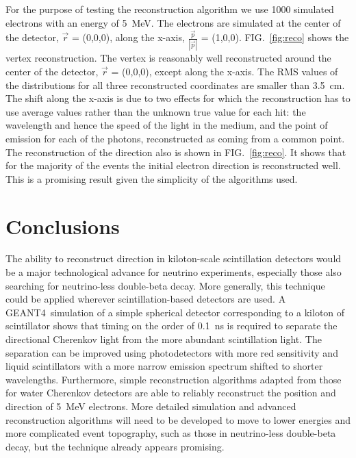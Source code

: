 \documentclass[aps,prc,twocolumn,groupedaddress,showpacs,amsmath,amssymb,floatfix,superscriptaddress]{revtex4}
\newcommand{\GEANT}{GEANT4}
\begin{document}
For the purpose of testing the reconstruction algorithm we use 1000
simulated electrons with an energy of 5~MeV. The electrons are
simulated at the center of the detector, $\vec{r}$ = (0,0,0), along
the x-axis, $\frac{\vec{p}}{|\vec{p}|}$ = (1,0,0). FIG.~\ref{fig:reco}
shows the vertex reconstruction. The vertex is reasonably well
reconstructed around the center of the detector, $\vec{r}$ = (0,0,0),
except along the x-axis. The RMS values of the distributions for all three
reconstructed coordinates are smaller than 3.5~cm. The shift along
the x-axis is due to two effects for which the reconstruction has to
use average values rather than the unknown true value for each
hit: the wavelength and hence the speed of the light in the medium,
and the point of emission for each of the photons, reconstructed
as coming from a common point. The reconstruction of the direction
also is shown in FIG.~\ref{fig:reco}. It shows that for the majority
of the events the initial electron direction is reconstructed well.
This is a promising result given the simplicity of the algorithms
used.

\section{Conclusions}
The ability to reconstruct direction in kiloton-scale scintillation
detectors would be a major technological advance for neutrino
experiments, especially those also
searching for neutrino-less double-beta decay. More generally, this technique could
be applied wherever scintillation-based detectors are used. A \GEANT~simulation of a simple spherical detector corresponding to a kiloton
of scintillator shows that timing on the order of 0.1~ns is required
to separate the directional Cherenkov light from the more abundant
scintillation light. The separation can be improved using
photodetectors with more red sensitivity and liquid scintillators with
a more narrow emission spectrum shifted to shorter
wavelengths. Furthermore, simple reconstruction algorithms adapted
from those for water Cherenkov detectors are able to reliably
reconstruct the position and direction of 5~MeV electrons. More
detailed simulation and advanced reconstruction algorithms will need
to be developed to move to lower energies and more complicated event
topography, such as those in neutrino-less double-beta decay, but the technique already
appears promising.
\end{document}
